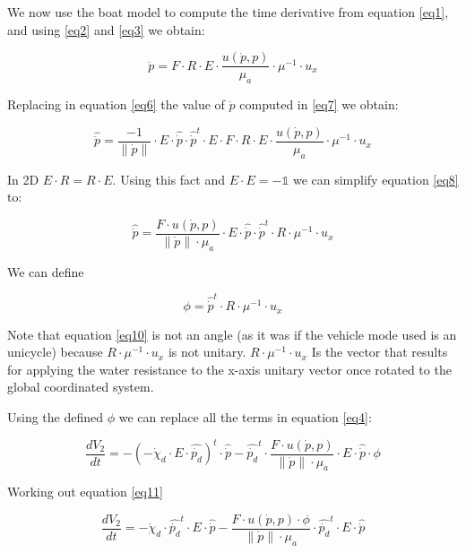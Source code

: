 \documentclass[conference]{IEEEtran}
\begin{document}
We now use the boat model to compute the time derivative from equation \ref{eq1}, and using \ref{eq2} and \ref{eq3} we obtain:

\begin{equation}
\ddot{p}=F\cdot R \cdot E \cdot \frac{u(\dot{p},p)}{\mu_{a}}\cdot \mu^{-1} \cdot u_{x}
\end{equation} \label{eq7}

Replacing in equation \ref{eq6} the value of $\ddot{p}$ computed in \ref{eq7} we obtain:

\begin{equation}
\hat{\ddot{p}}=\frac{-1}{\lVert\dot{p}\rVert}\cdot E\cdot \hat{\dot{p}}\cdot \hat{\dot{p}}^{t}\cdot E \cdot F\cdot R \cdot E \cdot \frac{u(\dot{p},p)}{\mu_{a}}\cdot \mu^{-1} \cdot u_{x}
\end{equation}\label{eq8}

In 2D $E\cdot R = R \cdot E$. Using this fact and $E\cdot E = -\mathbb{1}$ we can simplify equation \ref{eq8} to:

\begin{equation}
\hat{\ddot{p}}=\frac{F\cdot u(\dot{p},p)}{\lVert\dot{p}\rVert \cdot \mu_{a}}\cdot E\cdot \hat{\dot{p}}\cdot \hat{\dot{p}}^{t} \cdot R \cdot \mu^{-1} \cdot u_{x}
\end{equation} \label{eq9}

We can define

\begin{equation}
\phi = \hat{\dot{p}}^{t} \cdot R \cdot \mu^{-1} \cdot u_{x}
\end{equation} \label{eq10}

Note that equation \ref{eq10} is not an angle (as it was if the vehicle mode used is an unicycle) because $R \cdot \mu^{-1} \cdot u_{x}$ is not unitary.  $R \cdot \mu^{-1} \cdot u_{x}$ Is the vector that results for applying the water resistance to the x-axis unitary vector once rotated to the global coordinated system.

Using the defined $\phi$ we can replace all the terms in equation \ref{eq4}:

\begin{equation}
\frac{dV_{2}}{dt}=-(-\dot{\chi}_{d}\cdot E \cdot \hat{\dot{p_{d}}})^{t}\cdot \hat{\dot{p}}-\hat{\dot{p_{d}}}^{t}\cdot \frac{F\cdot u(\dot{p},p)}{\lVert\dot{p}\rVert \cdot \mu_{a}}\cdot E\cdot \hat{\dot{p}}\cdot \phi
\end{equation} \label{eq11}

Working out equation \ref{eq11}

\begin{equation}
\frac{dV_{2}}{dt}=-\dot{\chi}_{d}\cdot \hat{\dot{p_{d}}}^{t} \cdot E \cdot \hat{\dot{p}}- \frac{F\cdot u(\dot{p},p)\cdot \phi}{\lVert\dot{p}\rVert \cdot \mu_{a}}\cdot \hat{\dot{p_{d}}}^{t}\cdot E\cdot \hat{\dot{p}}
\end{equation} \label{eq12}
\end{document}
